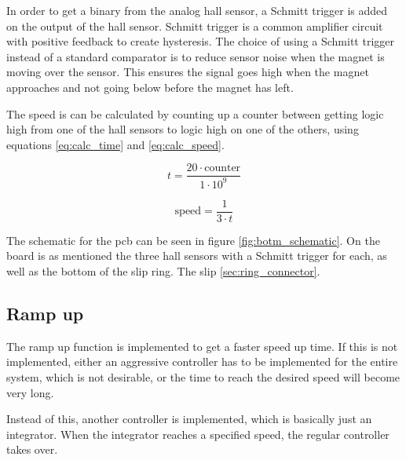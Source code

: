In order to get a binary from the analog hall sensor, a Schmitt trigger is added on the output of the hall sensor.
Schmitt trigger is a common amplifier circuit with positive feedback to create hysteresis.
The choice of using a Schmitt trigger instead of a standard comparator is to reduce sensor noise when the magnet is moving over the sensor.
This ensures the signal goes high when the magnet approaches and not going below before the magnet has left.

The speed is can be calculated by counting up a counter between getting logic high from one of the hall sensors to  logic high on one of the others, using equations  \ref{eq:calc_time} and \ref{eq:calc_speed}.

\begin{equation} \label{eq:calc_time}
 t = \frac{20\cdot \text{counter}}{1\cdot 10^9}
\end{equation}

\begin{equation} \label{eq:calc_speed}
 \text{speed} = \frac{1}{3\cdot t}
\end{equation}

The schematic for the pcb can be seen in figure \ref{fig:botm_schematic}.
On the board is as mentioned the three hall sensors with a Schmitt trigger for each, as well as the bottom of the slip ring. The slip \ref{sec:ring_connector}. 


\subsection{Ramp up}

The ramp up function is implemented to get a faster speed up time.
If this is not implemented, either an aggressive controller has to be implemented for the entire system, which is not desirable, or the time to reach the desired speed will become very long.

Instead of this, another controller is implemented, which is basically just an integrator.
When the integrator reaches a specified speed, the regular controller takes over. 